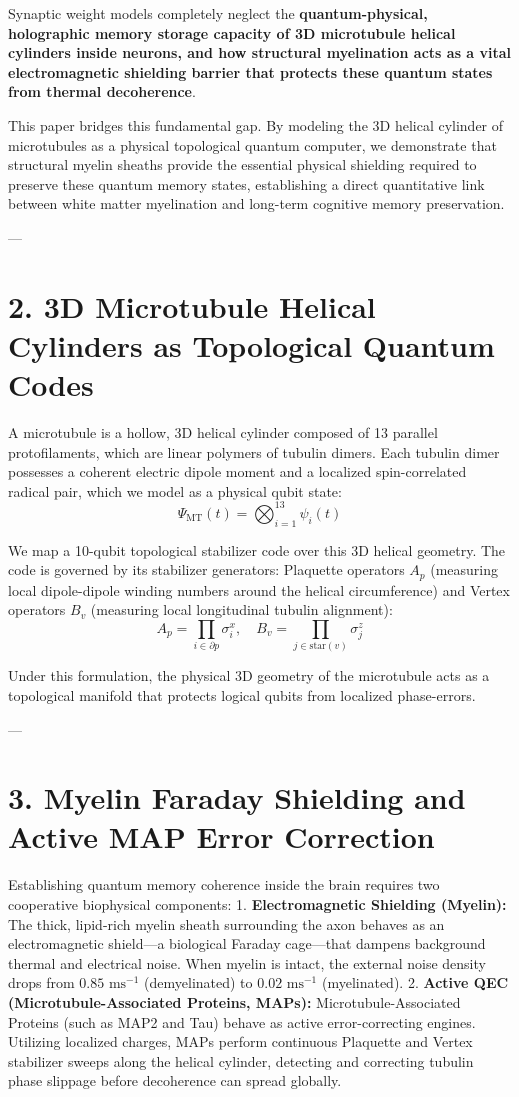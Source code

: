 \documentclass[11pt,twocolumn]{article}
\begin{document}
Synaptic weight models completely neglect the \textbf{quantum-physical, holographic memory storage capacity of 3D microtubule helical cylinders inside neurons, and how structural myelination acts as a vital electromagnetic shielding barrier that protects these quantum states from thermal decoherence}.

This paper bridges this fundamental gap. By modeling the 3D helical cylinder of microtubules as a physical topological quantum computer, we demonstrate that structural myelin sheaths provide the essential physical shielding required to preserve these quantum memory states, establishing a direct quantitative link between white matter myelination and long-term cognitive memory preservation.

---

\section{2. 3D Microtubule Helical Cylinders as Topological Quantum Codes}
A microtubule is a hollow, 3D helical cylinder composed of 13 parallel protofilaments, which are linear polymers of tubulin dimers. Each tubulin dimer possesses a coherent electric dipole moment and a localized spin-correlated radical pair, which we model as a physical qubit state:
$$\Psi_{\text{MT}}(t) = \bigotimes_{i=1}^{13} \psi_i(t)$$

We map a 10-qubit topological stabilizer code over this 3D helical geometry. The code is governed by its stabilizer generators: Plaquette operators $A_p$ (measuring local dipole-dipole winding numbers around the helical circumference) and Vertex operators $B_v$ (measuring local longitudinal tubulin alignment):
$$A_p = \prod_{i \in \partial p} \sigma_i^x, \quad B_v = \prod_{j \in \text{star}(v)} \sigma_j^z$$

Under this formulation, the physical 3D geometry of the microtubule acts as a topological manifold that protects logical qubits from localized phase-errors.

---

\section{3. Myelin Faraday Shielding and Active MAP Error Correction}
Establishing quantum memory coherence inside the brain requires two cooperative biophysical components:
1.  \textbf{Electromagnetic Shielding (Myelin):} The thick, lipid-rich myelin sheath surrounding the axon behaves as an electromagnetic shield—a biological Faraday cage—that dampens background thermal and electrical noise. When myelin is intact, the external noise density drops from $0.85\text{ ms}^{-1}$ (demyelinated) to $0.02\text{ ms}^{-1}$ (myelinated).
2.  \textbf{Active QEC (Microtubule-Associated Proteins, MAPs):} Microtubule-Associated Proteins (such as MAP2 and Tau) behave as active error-correcting engines. Utilizing localized charges, MAPs perform continuous Plaquette and Vertex stabilizer sweeps along the helical cylinder, detecting and correcting tubulin phase slippage before decoherence can spread globally.
\end{document}
